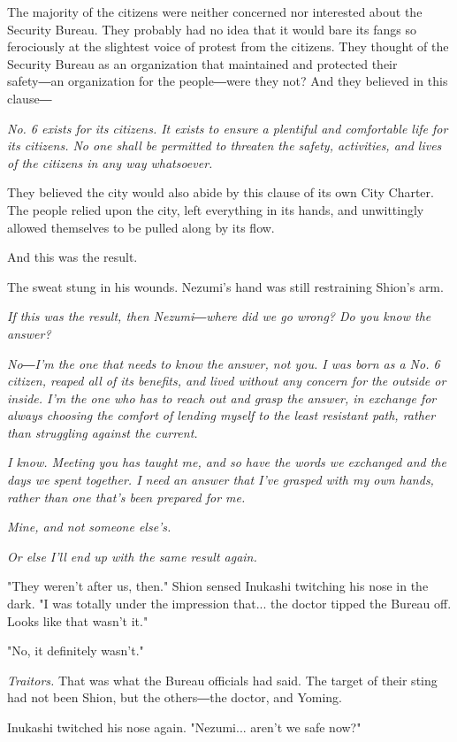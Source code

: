 The majority of the citizens were neither concerned nor interested about
the Security Bureau. They probably had no idea that it would bare its
fangs so ferociously at the slightest voice of protest from the
citizens. They thought of the Security Bureau as an organization that
maintained and protected their safety―an organization for the
people―were they not? And they believed in this clause―

\emph{No. 6 exists for its citizens. It exists to ensure a plentiful and
comfortable life for its citizens. No one shall be permitted to threaten
the safety, activities, and lives of the citizens in any way whatsoever.}

They believed the city would also abide by this clause of its own City
Charter. The people relied upon the city, left everything in its hands,
and unwittingly allowed themselves to be pulled along by its flow.

And this was the result.

The sweat stung in his wounds. Nezumi's hand was still restraining
Shion's arm.

\emph{If this was the result, then Nezumi―where did we go wrong? Do you know
the answer?}

\emph{No―I'm the one that needs to know the answer, not you. I was born as a
No. 6 citizen, reaped all of its benefits, and lived without any concern
for the outside or inside. I'm the one who has to reach out and grasp
the answer, in exchange for always choosing the comfort of lending
myself to the least resistant path, rather than struggling against the
current.}

\emph{I know. Meeting you has taught me, and so have the words we exchanged
and the days we spent together. I need an answer that I've grasped with
my own hands, rather than one that's been prepared for me.}

\emph{Mine, and not someone else's.}

\emph{Or else I'll end up with the same result again.}

"They weren't after us, then." Shion sensed Inukashi twitching his nose
in the dark. "I was totally under the impression that... the doctor
tipped the Bureau off. Looks like that wasn't it."

"No, it definitely wasn't."

\emph{Traitors.} That was what the Bureau officials had said. The target of
their sting had not been Shion, but the others―the doctor, and Yoming.

Inukashi twitched his nose again. "Nezumi... aren't we safe now?"

